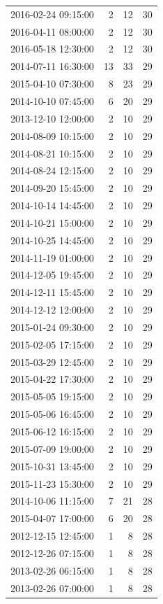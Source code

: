 \begin{tabular}{lrrr}
2016-02-24 09:15:00 & 2 & 12 & 30 \\
2016-04-11 08:00:00 & 2 & 12 & 30 \\
2016-05-18 12:30:00 & 2 & 12 & 30 \\
2014-07-11 16:30:00 & 13 & 33 & 29 \\
2015-04-10 07:30:00 & 8 & 23 & 29 \\
2014-10-10 07:45:00 & 6 & 20 & 29 \\
2013-12-10 12:00:00 & 2 & 10 & 29 \\
2014-08-09 10:15:00 & 2 & 10 & 29 \\
2014-08-21 10:15:00 & 2 & 10 & 29 \\
2014-08-24 12:15:00 & 2 & 10 & 29 \\
2014-09-20 15:45:00 & 2 & 10 & 29 \\
2014-10-14 14:45:00 & 2 & 10 & 29 \\
2014-10-21 15:00:00 & 2 & 10 & 29 \\
2014-10-25 14:45:00 & 2 & 10 & 29 \\
2014-11-19 01:00:00 & 2 & 10 & 29 \\
2014-12-05 19:45:00 & 2 & 10 & 29 \\
2014-12-11 15:45:00 & 2 & 10 & 29 \\
2014-12-12 12:00:00 & 2 & 10 & 29 \\
2015-01-24 09:30:00 & 2 & 10 & 29 \\
2015-02-05 17:15:00 & 2 & 10 & 29 \\
2015-03-29 12:45:00 & 2 & 10 & 29 \\
2015-04-22 17:30:00 & 2 & 10 & 29 \\
2015-05-05 19:15:00 & 2 & 10 & 29 \\
2015-05-06 16:45:00 & 2 & 10 & 29 \\
2015-06-12 16:15:00 & 2 & 10 & 29 \\
2015-07-09 19:00:00 & 2 & 10 & 29 \\
2015-10-31 13:45:00 & 2 & 10 & 29 \\
2015-11-23 15:30:00 & 2 & 10 & 29 \\
2014-10-06 11:15:00 & 7 & 21 & 28 \\
2015-04-07 17:00:00 & 6 & 20 & 28 \\
2012-12-15 12:45:00 & 1 & 8 & 28 \\
2012-12-26 07:15:00 & 1 & 8 & 28 \\
2013-02-26 06:15:00 & 1 & 8 & 28 \\
2013-02-26 07:00:00 & 1 & 8 & 28 \\

\end{tabular}
